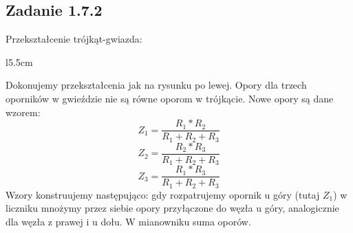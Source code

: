\pagebreak
\subsection*{Zadanie 1.7.2} 
Przekształcenie trójkąt-gwiazda:

\begin{wrapfigure}{l}{5.5cm}
\end{wrapfigure}
Dokonujemy przekształcenia jak na rysunku po lewej. Opory dla trzech oporników w gwieździe nie są równe oporom w trójkącie. Nowe opory są dane wzorem:
\begin{equation}
Z_{1} = \frac{R_{1} * R_{2}}{R_{1} + R_{2} + R_{3}}
\end{equation}
\begin{equation}
Z_{2} = \frac{R_{2} * R_{3}}{R_{1} + R_{2} + R_{3}}
\end{equation}
\begin{equation}
Z_{3} = \frac{R_{1} * R_{3}}{R_{1} + R_{2} + R_{3}}
\end{equation}
Wzory konstruujemy następująco: gdy rozpatrujemy opornik u góry (tutaj $Z_{1}$) w liczniku mnożymy przez siebie opory przyłączone do węzła u góry, analogicznie dla węzła z prawej i u dołu. W mianowniku suma oporów.

